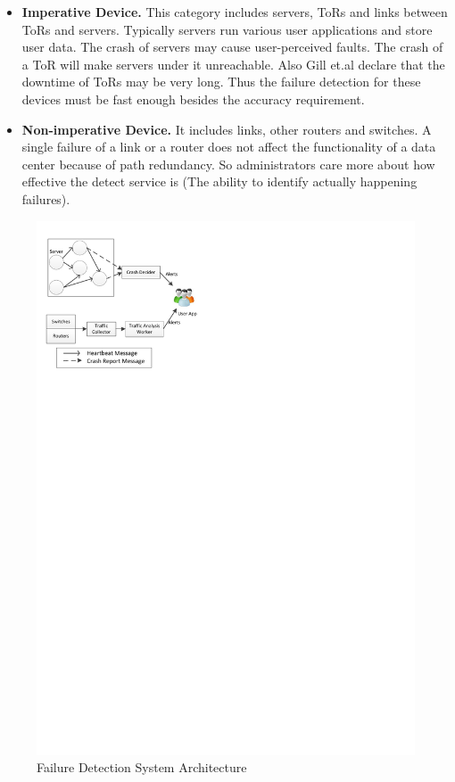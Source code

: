 \documentclass{sig-alternate-05-2015}
\begin{document}
\begin{itemize}
\item \textbf{Imperative Device.} This category includes servers, ToRs and links between ToRs and servers. Typically servers run various user applications and store user data. The crash of servers may cause user-perceived faults. The crash of a ToR will make servers under it unreachable. Also Gill et.al declare that the downtime of ToRs may be very long. Thus the failure detection for these devices must be fast enough besides the accuracy requirement.

\item \textbf{Non-imperative Device.} It includes links, other routers and switches. A single failure of a link or a router does not affect the functionality of a data center because of path redundancy. So administrators care more about how effective the detect service is (The ability to identify actually happening failures).

\end{itemize}

\begin{figure}
\centering
\includegraphics{system}
\caption{Failure Detection System Architecture}
\end{figure}
\end{document}
